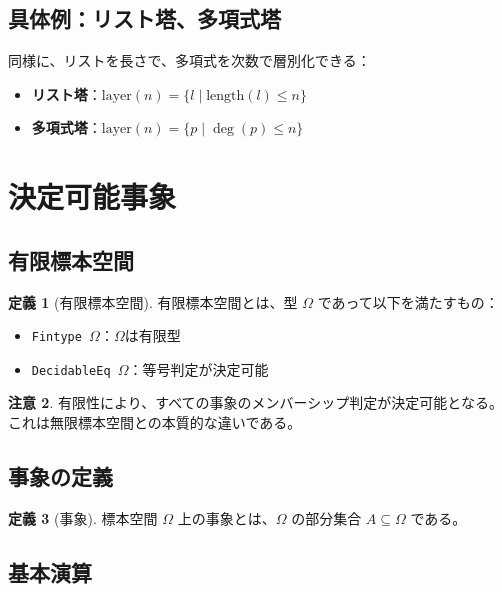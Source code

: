 \documentclass[a4paper,12pt]{ltjsarticle}
\theoremstyle{definition}
\newtheorem{definition}{定義}[section]
\newtheorem{remark}[definition]{注意}
\begin{document}
\subsection{具体例：リスト塔、多項式塔}

同様に、リストを長さで、多項式を次数で層別化できる：
\begin{itemize}
\item \textbf{リスト塔}：$\text{layer}(n) = \{l \mid \text{length}(l) \leq n\}$
\item \textbf{多項式塔}：$\text{layer}(n) = \{p \mid \deg(p) \leq n\}$
\end{itemize}

\section{決定可能事象}

\subsection{有限標本空間}

\begin{definition}[有限標本空間]
有限標本空間とは、型 $\Omega$ であって以下を満たすもの：
\begin{itemize}
\item \texttt{Fintype $\Omega$}：$\Omega$は有限型
\item \texttt{DecidableEq $\Omega$}：等号判定が決定可能
\end{itemize}
\end{definition}

\begin{remark}
有限性により、すべての事象のメンバーシップ判定が決定可能となる。これは無限標本空間との本質的な違いである。
\end{remark}

\subsection{事象の定義}

\begin{definition}[事象]
標本空間 $\Omega$ 上の事象とは、$\Omega$ の部分集合 $A \subseteq \Omega$ である。
\end{definition}

\subsection{基本演算}
\end{document}
